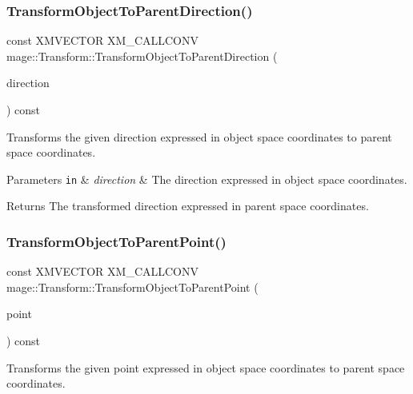 \subsubsection{\texorpdfstring{Transform\+Object\+To\+Parent\+Direction()}{TransformObjectToParentDirection()}}
{\footnotesize\ttfamily const X\+M\+V\+E\+C\+T\+OR X\+M\+\_\+\+C\+A\+L\+L\+C\+O\+NV mage\+::\+Transform\+::\+Transform\+Object\+To\+Parent\+Direction (\begin{DoxyParamCaption}\item[{F\+X\+M\+V\+E\+C\+T\+OR}]{direction }\end{DoxyParamCaption}) const\hspace{0.3cm}{\ttfamily [noexcept]}}

Transforms the given direction expressed in object space coordinates to parent space coordinates.


\begin{DoxyParams}[1]{Parameters}
\mbox{\tt in}  & {\em direction} & The direction expressed in object space coordinates. \\
\hline
\end{DoxyParams}
\begin{DoxyReturn}{Returns}
The transformed direction expressed in parent space coordinates. 
\end{DoxyReturn}
\hypertarget{classmage_1_1_transform_a2d93dac4ae0b5b2723d2fbce077da85f}{}\label{classmage_1_1_transform_a2d93dac4ae0b5b2723d2fbce077da85f} 
\subsubsection{\texorpdfstring{Transform\+Object\+To\+Parent\+Point()}{TransformObjectToParentPoint()}}
{\footnotesize\ttfamily const X\+M\+V\+E\+C\+T\+OR X\+M\+\_\+\+C\+A\+L\+L\+C\+O\+NV mage\+::\+Transform\+::\+Transform\+Object\+To\+Parent\+Point (\begin{DoxyParamCaption}\item[{F\+X\+M\+V\+E\+C\+T\+OR}]{point }\end{DoxyParamCaption}) const\hspace{0.3cm}{\ttfamily [noexcept]}}

Transforms the given point expressed in object space coordinates to parent space coordinates.


